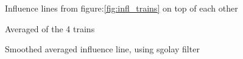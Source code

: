 \begin{figure}[H]
\centering

\caption{Influence lines from figure:\ref{fig:infl_trains} on top of each other}\label{fig:infl_all_trains}
\end{figure}

\begin{figure}[H]
\centering

\caption{Averaged of the 4 trains}
\label{fig:infl_averaged}
\end{figure}

% 

\begin{figure}[H]
\centering

\caption{Smoothed averaged influence line, using sgolay filter}
\label{fig:infl_averaged_smoothed}
\end{figure}
